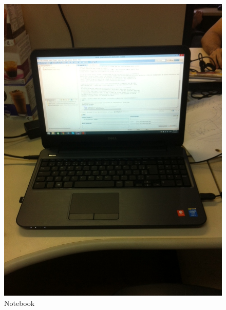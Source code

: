 \begin{figure}[h!]
 \centering
 \includegraphics[width=1\columnwidth]{Notebook/foto}
 \caption{Notebook}
\end{figure}
